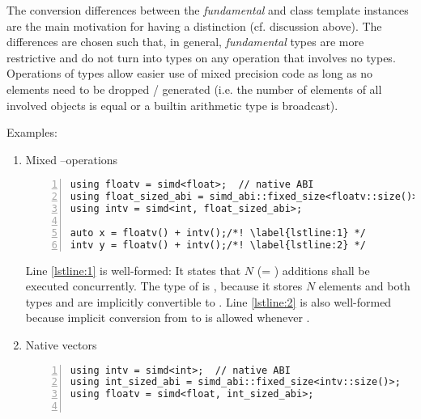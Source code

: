 The conversion differences between the \textit{fundamental} and \fixedsize class template instances are the main motivation for having a distinction (cf. discussion above).
The differences are chosen such that, in general, \textit{fundamental} types are more restrictive and do not turn into \fixedsize types on any operation that involves no \fixedsize types.
Operations of \fixedsize types allow easier use of mixed precision code as long as no elements need to be dropped / generated (i.e. the number of elements of all involved \simd objects is equal or a builtin arithmetic type is broadcast).

Examples:

\begin{enumerate}
  \item Mixed \intt--\float operations
\smallskip\begin{lstlisting}[style=Vc,numbers=left]
using floatv = simd<float>;  // native ABI
using float_sized_abi = simd_abi::fixed_size<floatv::size()>;
using intv = simd<int, float_sized_abi>;

auto x = floatv() + intv();/*! \label{lstline:1} */
intv y = floatv() + intv();/*! \label{lstline:2} */
\end{lstlisting}
    Line \ref{lstline:1} is well-formed:
    It states that $N$ (= ) additions shall be executed concurrently.
    The type of  is \simd[<\float{}>], because it stores $N$ elements and both types  and  are implicitly convertible to \simd[<\float{}>].
    Line \ref{lstline:2} is also well-formed because implicit conversion from  to  is allowed whenever .

  \item Native \intt vectors
\smallskip\begin{lstlisting}[style=Vc,numbers=left]
using intv = simd<int>;  // native ABI
using int_sized_abi = simd_abi::fixed_size<intv::size()>;
using floatv = simd<float, int_sized_abi>;


\end{lstlisting}
\end{enumerate}
